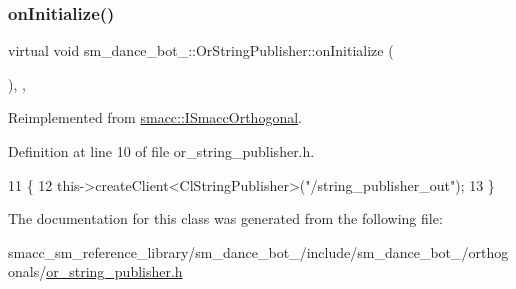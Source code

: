 \subsubsection{\texorpdfstring{on\+Initialize()}{onInitialize()}}
{\footnotesize\ttfamily virtual void sm\+\_\+dance\+\_\+bot\+\_\+::\+Or\+String\+Publisher\+::on\+Initialize (\begin{DoxyParamCaption}{ }\end{DoxyParamCaption})\hspace{0.3cm}{\ttfamily [inline]}, {\ttfamily [override]}, {\ttfamily [virtual]}}



Reimplemented from \hyperlink{classsmacc_1_1ISmaccOrthogonal_a6bb31c620cb64dd7b8417f8705c79c7a}{smacc\+::\+I\+Smacc\+Orthogonal}.



Definition at line 10 of file or\+\_\+string\+\_\+publisher.\+h.


\begin{DoxyCode}
11     \{
12         this->createClient<ClStringPublisher>(\textcolor{stringliteral}{"/string\_publisher\_out"});
13     \}
\end{DoxyCode}


The documentation for this class was generated from the following file\+:\begin{DoxyCompactItemize}
\item 
smacc\+\_\+sm\+\_\+reference\+\_\+library/sm\+\_\+dance\+\_\+bot\+\_/include/sm\+\_\+dance\+\_\+bot\+\_/orthogonals/\hyperlink{2_2include_2sm__dance__bot__2_2orthogonals_2or__string__publisher_8h}{or\+\_\+string\+\_\+publisher.\+h}\end{DoxyCompactItemize}
